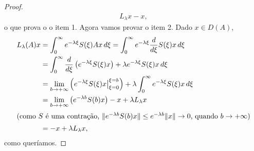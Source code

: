 \begin{proof}
\begin{align*}
L_\lambda x-x,
\end{align*}
o que prova o o item 1. Agora vamos provar o item 2. Dado $x\in D(A)$, 
\begin{align*}
L_\lambda(A)x& =\int_0^{\infty}e^{-\lambda
 \xi}S(\xi)Ax\,d\xi=\int_0^{\infty}e^{-\lambda
 \xi}\frac{d}{d\xi}S(\xi)x\,d\xi\\
& =\int_0^{\infty}\frac{d}{d\xi}\left(e^{-\lambda
 \xi}S(\xi)x\right)+\lambda e^{-\lambda
 \xi}S(\xi)x \,d\xi\\
& =\lim_{b\to +\infty}\left(e^{-\lambda
 \xi}S(\xi)x\big\vert_{\xi=0}^{\xi=b}\right)+\lambda \int_0^{\infty}e^{-\lambda
 \xi}S(\xi)x \,d\xi\\
& =\lim_{b\to +\infty}\left(e^{-\lambda
 b}S(b)x\right)-x+\lambda L_\lambda x\\
\shortintertext{(como $S$ é uma contração, $\|e^{-\lambda b}S(b)x\|\leq e^{-\lambda b}\|x\|\to 0$, quando $b\to +\infty$)}
& =-x+\lambda L_\lambda x,
\end{align*}
como queríamos.
\end{proof}
